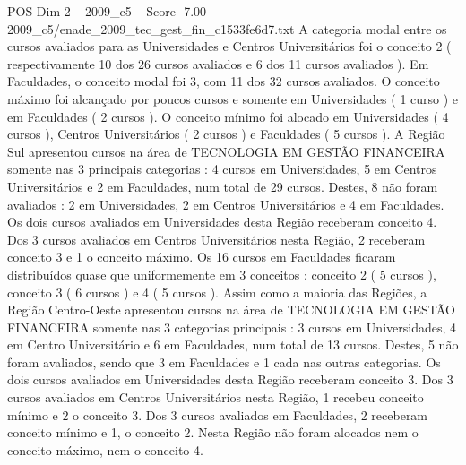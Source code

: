 \begin{textsample}{POS Dim 2 – 2009\_c5 – Score -7.00 – 2009\_c5/enade\_2009\_tec\_gest\_fin\_c1533fe6d7.txt}
A categoria modal entre os cursos avaliados para as Universidades e Centros Universitários foi o conceito 2 ( respectivamente 10 dos 26 cursos avaliados e 6 dos 11 cursos avaliados ).
Em Faculdades, o conceito modal foi 3, com 11 dos 32 cursos avaliados.
O conceito máximo foi alcançado por poucos cursos e somente em Universidades ( 1 curso ) e em Faculdades ( 2 cursos ).
O conceito mínimo foi alocado em Universidades ( 4 cursos ), Centros Universitários ( 2 cursos ) e Faculdades ( 5 cursos ).
A Região Sul apresentou cursos na área de TECNOLOGIA EM GESTÃO FINANCEIRA somente nas 3 principais categorias : 4 cursos em Universidades, 5 em Centros Universitários e 2 em Faculdades, num total de 29 cursos.
Destes, 8 não foram avaliados : 2 em Universidades, 2 em Centros Universitários e 4 em Faculdades.
Os dois cursos avaliados em Universidades desta Região receberam conceito 4.
Dos 3 cursos avaliados em Centros Universitários nesta Região, 2 receberam conceito 3 e 1 o conceito máximo.
Os 16 cursos em Faculdades ficaram distribuídos quase que uniformemente em 3 conceitos : conceito 2 ( 5 cursos ), conceito 3 ( 6 cursos ) e 4 ( 5 cursos ).
Assim como a maioria das Regiões, a Região Centro-Oeste apresentou cursos na área de TECNOLOGIA EM GESTÃO FINANCEIRA somente nas 3 categorias principais : 3 cursos em Universidades, 4 em Centro Universitário e 6 em Faculdades, num total de 13 cursos.
Destes, 5 não foram avaliados, sendo que 3 em Faculdades e 1 cada nas outras categorias.
Os dois cursos avaliados em Universidades desta Região receberam conceito 3.
Dos 3 cursos avaliados em Centros Universitários nesta Região, 1 recebeu conceito mínimo e 2 o conceito 3.
Dos 3 cursos avaliados em Faculdades, 2 receberam conceito mínimo e 1, o conceito 2.
Nesta Região não foram alocados nem o conceito máximo, nem o conceito 4.

\end{textsample}
